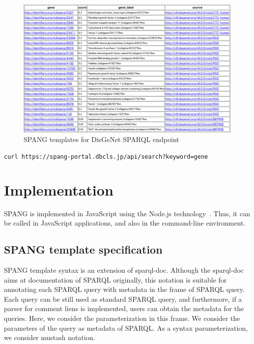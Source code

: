 \documentclass[runningheads]{llncs}
\begin{document}
\begin{figure}
\center
\includegraphics[width=1.0\textwidth]{spang_disease_gene_result.png}
\caption{SPANG templates for DisGeNet SPARQL endpoint}
\label{fig:spang_disease_gene_result}
\end{figure}




\texttt{curl https://spang-portal.dbcls.jp/api/search?keyword=gene}


\section{Implementation}

SPANG is implemented in JavaScript using the Node.js technology~\cite{nodejs}. Thus, it can be called in JavaScript applications, and also in the command-line environment.

\subsection{SPANG template specification}
SPANG template syntax is an extension of sparql-doc. Although the sparql-doc aims at documentation of SPARQL originally, this notation is suitable for annotating each SPARQL query with metadata in the frame of SPARQL query. Each query can be still used as standard SPARQL query, and furthermore, if a parser for comment liens is implemented, users can obtain the metadata for the queries.
Here, we consider the parameterization in this frame. We consider the parameters of the query as metadata of SPARQL.
As a syntax parameterization, we consider mustash notation.
\end{document}
